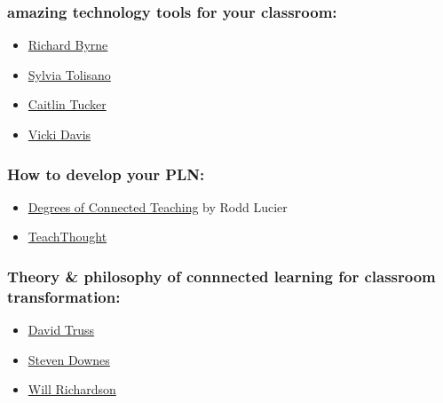 \subsubsection{amazing technology tools for your classroom:}

\begin{itemize}
\item
  \href{http://www.freetech4teachers.com/}{Richard Byrne}
\item
  \href{http://langwitches.org/blog/}{Sylvia Tolisano}
\item
  \href{http://catlintucker.com/2011/11/12-tech-tools-that-will-transform-your-classroom/}{Caitlin
  Tucker}
\item
  \href{http://coolcatteacher.blogspot.ca/}{Vicki Davis}
\end{itemize}

\subsubsection{How to develop your PLN:}

\begin{itemize}
\item
  \href{\%20http://thecleversheep.blogspot.ca/2012/06/seven-degrees-of-connectedness\_06.html}{Degrees
  of Connected Teaching} by Rodd Lucier
\item
  \href{\%20http://thecleversheep.blogspot.ca/2012/06/seven-degrees-of-connectedness\_06.html}{TeachThought}
\end{itemize}

\subsubsection{Theory \& philosophy of connnected learning for classroom
transformation:}

\begin{itemize}
\item
  \href{http://pairadimes.davidtruss.com/}{David Truss}
\item
  \href{http://www.downes.ca/presentation/264}{Steven Downes}
\item
  \href{http://willrichardson.com/}{Will Richardson}
\end{itemize}
